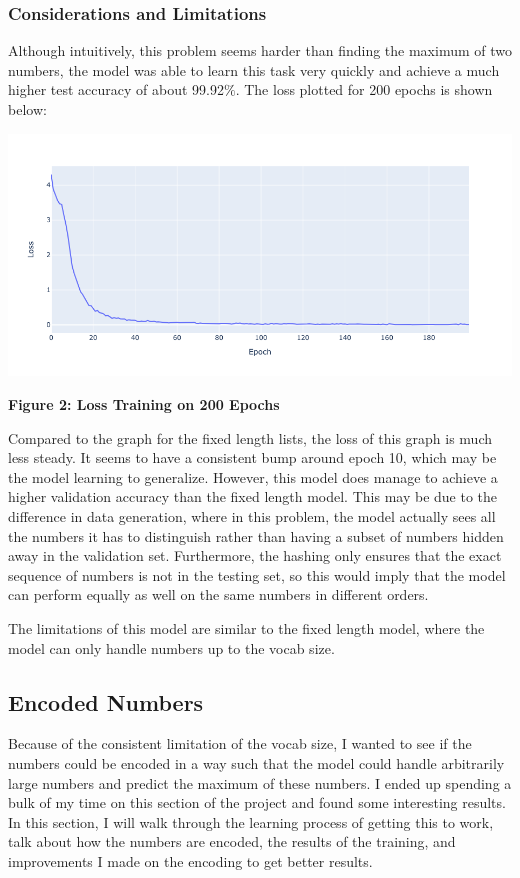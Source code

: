 \documentclass{article}
\begin{document}
\subsubsection{Considerations and Limitations}
Although intuitively, this problem seems harder than finding the maximum of two numbers, the model was able to learn this task very quickly and achieve a much higher test accuracy of about 99.92$\%$. The loss plotted for 200 epochs is shown below:
\begin{center}
    \includegraphics[scale=0.4]{variable_length.png}

    \textbf{Figure 2: Loss Training on 200 Epochs}
\end{center}

Compared to the graph for the fixed length lists, the loss of this graph is much less steady. It seems to have a consistent bump around epoch 10, which may be the model learning to generalize. However, this model does manage to achieve a higher validation accuracy than the fixed length model. This may be due to the difference in data generation, where in this problem, the model actually sees all the numbers it has to distinguish rather than having a subset of numbers hidden away in the validation set. Furthermore, the hashing only ensures that the exact sequence of numbers is not in the testing set, so this would imply that the model can perform equally as well on the same numbers in different orders. 

The limitations of this model are similar to the fixed length model, where the model can only handle numbers up to the vocab size.


\subsection{Encoded Numbers}
Because of the consistent limitation of the vocab size, I wanted to see if the numbers could be encoded in a way such that the model could handle arbitrarily large numbers and predict the maximum of these numbers. I ended up spending a bulk of my time on this section of the project and found some interesting results. In this section, I will walk through the learning process of getting this to work, talk about how the numbers are encoded, the results of the training, and improvements I made on the encoding to get better results. 
\end{document}
